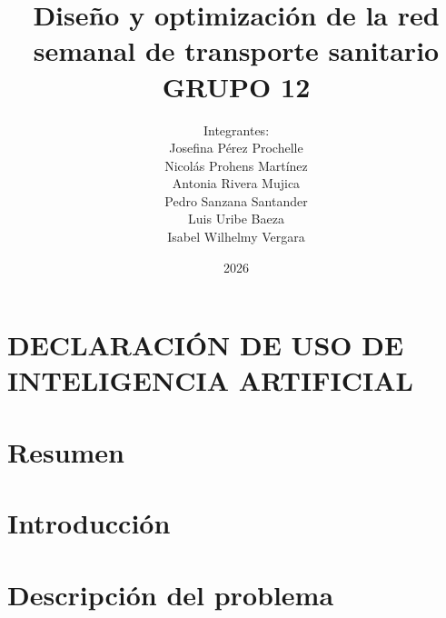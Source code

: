 \documentclass[pdftex]{pucthesis}
\begin{document}
\title[Diseño y optimización de la red semanal de transporte sanitario\\ GRUPO 12]
   {\bf Diseño y optimización de la red semanal de transporte sanitario\\ GRUPO 12}
\author[Integrantes:]{Integrantes:\\
\textnormal{\small{
Josefina Pérez Prochelle\\
Nicolás Prohens Martínez\\
Antonia Rivera Mujica\\
Pedro Sanzana Santander\\
Luis Uribe Baeza\\
Isabel Wilhelmy Vergara}}}
\address{Escuela de Ingenier\'ia\\ Pontificia Universidad Cat\'olica de Chile}
\date{2026}

\NoChapterPageNumber
{}
\maketitle

\chapter*{DECLARACIÓN DE USO DE INTELIGENCIA ARTIFICIAL}

\cleardoublepage

\tableofcontents
\cleardoublepage


\chapter[RESUMEN]{Resumen}


\chapter[INTRODUCCIÓN]{Introducción}


\chapter[DESCRIPCIÓN DEL PROBLEMA]{Descripción del problema}\label{cap:descripcion}

\end{document}
